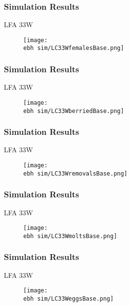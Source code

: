 \documentclass{beamer}
\newcommand{\ebh}{\string~/bio.data/bio.lobster/figures/LFA2733Framework2018/} %
\begin{document}
\begin{frame}
\frametitle{Simulation Results}
LFA 33W 
\begin{figure}
        \begin{center}
            \texttt{[image: \\ebh sim/LC33WfemalesBase.png]}
        \end{center}
    \end{figure}
\end{frame}


\begin{frame}
\frametitle{Simulation Results}
LFA 33W 
\begin{figure}
        \begin{center}
            \texttt{[image: \\ebh sim/LC33WberriedBase.png]}
        \end{center}
    \end{figure}
\end{frame}


\begin{frame}
\frametitle{Simulation Results}
LFA 33W 
\begin{figure}
        \begin{center}
            \texttt{[image: \\ebh sim/LC33WremovalsBase.png]}
        \end{center}
    \end{figure}
\end{frame}


\begin{frame}
\frametitle{Simulation Results}
LFA 33W 
\begin{figure}
        \begin{center}
            \texttt{[image: \\ebh sim/LC33WmoltsBase.png]}
        \end{center}
    \end{figure}
\end{frame}


\begin{frame}
\frametitle{Simulation Results}
LFA 33W 
\begin{figure}
        \begin{center}
            \texttt{[image: \\ebh sim/LC33WeggsBase.png]}
        \end{center}
    \end{figure}
\end{frame}
\end{document}
